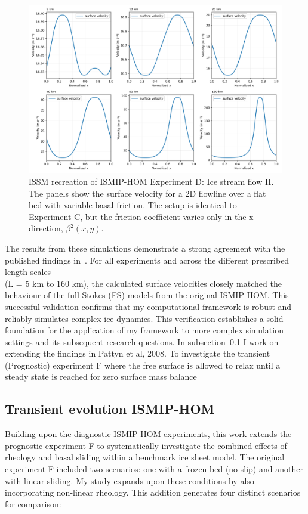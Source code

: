 \begin{figure}[H]
    \includegraphics[scale=0.49]{ExpD_velocity_panels.png}
    \caption{ ISSM recreation of ISMIP-HOM Experiment D: Ice stream flow II. The panels show the surface velocity for a 2D flowline over a flat bed with variable basal friction. The setup is identical to Experiment C, but the friction coefficient varies only in the x-direction, $\beta^{2}(x,y)$.}
    \label{fig:4.4}
\end{figure}

The results from these simulations demonstrate a strong agreement with the published findings in~\cite{Pattyn_2008}. For all experiments and across the different prescribed length scales \\(L = 5 km to 160 km), the calculated surface velocities closely matched the behaviour of the full-Stokes (FS) models from the original ISMIP-HOM. This successful validation confirms that my computational framework is robust and reliably simulates complex ice dynamics. This verification establishes a solid foundation for the application of my framework to more complex simulation settings and its subsequent research questions. In subsection~\ref{transient_ismip} I work on extending the findings in Pattyn et al, 2008. To investigate the transient (Prognostic) experiment F where the free surface is allowed to relax until a steady state is reached for zero surface mass balance~\cite{Pattyn_2008}


\subsection{Transient evolution ISMIP-HOM}\label{transient_ismip}
Building upon the diagnostic ISMIP-HOM experiments, this work extends the prognostic experiment F to systematically investigate the combined effects of rheology and basal sliding within a benchmark ice sheet model. The original experiment F included two scenarios: one with a frozen bed (no-slip) and another with linear sliding. My study expands upon these conditions by also incorporating non-linear rheology. This addition generates four distinct scenarios for comparison:

